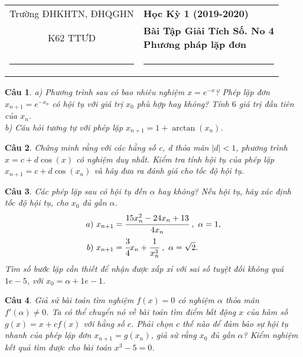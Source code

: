 \documentclass[11pt]{article}
\newtheorem{bt}{Câu}
\begin{document}
\begin{tabular*}
{\linewidth}{c>{\centering\hspace{0pt}} p{}}
Trường ĐHKHTN, ĐHQGHN & {\bf Học Kỳ 1 (2019-2020)}
\tabularnewline
K62 TTƯD & {\bf Bài Tập Giải Tích Số. No 4 \\ Phương pháp lặp đơn}
\tabularnewline
\rule{1in}{1pt}  \small  & \rule{2in}{1pt} %
\tabularnewline

\end{tabular*}
%

\begin{bt} %
a) Phương trình sau có bao nhiêu nghiệm $x=e^{-x}$? Phép lặp đơn $x_{n+1}=e^{-x_n}$ có hội tụ với giá trị $x_0$ phù hợp hay không? Tính $6$ giá trị đầu tiên của $x_n$.\\
b) Câu hỏi tương tự với phép lặp $x_{n+1} = 1 + \arctan(x_n)$.
\end{bt}

\begin{bt} %
Chứng minh rằng với các hằng số c, d thỏa mãn $|d|<1$, phương trình $x=c+d \cos(x)$ có nghiệm duy nhất. Kiểm tra tính hội tụ của phép lặp $x_{n+1}=c+d \cos(x_n)$ và hãy đưa ra đánh giá cho tốc độ hội tụ.
\end{bt}

\begin{bt} %
Các phép lặp sau có hội tụ đến $\alpha$ hay không? Nếu hội tụ, hãy xác định tốc độ hội tụ, cho $x_0$ đủ gần $\alpha$.
%
\begin{align*}
a) \  x_{n+1} &= \cfrac{15 x_n^2-24x_n+13}{4x_n} \ , \ \alpha=1, \\
b) \  x_{n+1} &= \cfrac{3}{4} x_n + \cfrac{1}{x_n^3} \ , \ \alpha=\sqrt{2}.
\end{align*}
%
Tìm số bước lặp cần thiết để nhận được xấp xỉ với sai số tuyệt đối không quá $1e-5$, với $x_0 = \alpha + 1e-1$. 
\end{bt}

\begin{bt} %
Giả sử bài toán tìm nghiệm $f(x)=0$ có nghiệm $\alpha$ thỏa mãn $f'(\alpha)\not=0$. Ta có thể chuyển nó về bài toán tìm điểm bất động $x$ của hàm số $g(x)=x+cf(x)$ với hằng số $c$. Phải chọn $c$ thế nào để đảm bảo sự hội tụ nhanh của phép lặp đơn $x_{n+1}=g(x_n)$, giả sử rằng $x_0$ đủ gần $\alpha$? Kiểm nghiệm kết quả tìm được cho bài toán $x^3-5=0$.
\end{bt}
\end{document}
